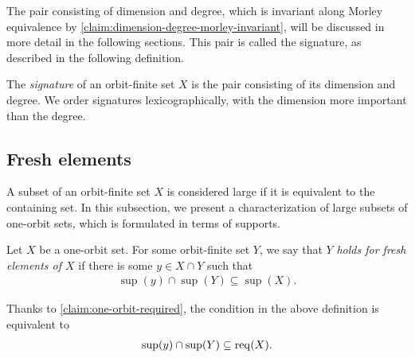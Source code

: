 The pair consisting of dimension and degree, which is invariant along Morley equivalence by \cref{claim:dimension-degree-morley-invariant}, will be discussed in more detail in the following sections. This pair is called the signature, as described in the following definition.


\begin{definition}[Signature]
	The \emph{signature} of an orbit-finite set $X$ is the pair consisting of its dimension and degree. We order signatures lexicographically, with the dimension more important than the degree.
\end{definition}


\subsection{Fresh elements}
\label{sec:fresh-elements}

A subset of an orbit-finite set $X$ is considered large if it is equivalent to the containing set. In this subsection, we present a characterization of large subsets of one-orbit sets, which is formulated in terms of supports. 

\begin{definition}
    \label{def:fresh-elements}
    Let $X$ be a one-orbit set. For some orbit-finite set $Y$, we say that $Y$ \emph{holds for fresh elements of $X$} if there is some $y \in X \cap Y$ such that 
    \begin{align*}
    \sup(y) \cap \sup(Y) \subseteq \sup(X).
    \end{align*}
\end{definition}

Thanks to \cref{claim:one-orbit-required}, the condition in the above definition is equivalent to 
\begin{align*}
\sup(y) \cap \sup(Y) \subseteq \operatorname{req}(X).
\end{align*}

